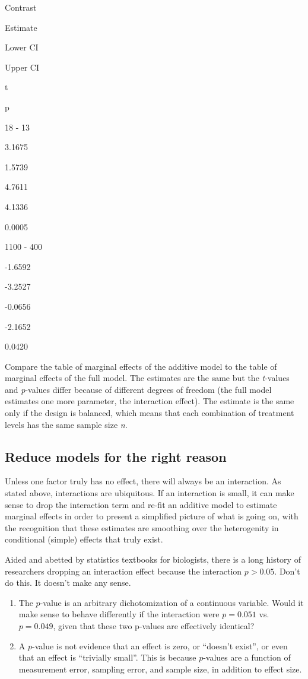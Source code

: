 \documentclass[]{book}
\providecommand{\tightlist}{%
  \setlength{\itemsep}{0pt}\setlength{\parskip}{0pt}}
\begin{document}
Contrast

Estimate

Lower CI

Upper CI

t

p

18 - 13

3.1675

1.5739

4.7611

4.1336

0.0005

1100 - 400

-1.6592

-3.2527

-0.0656

-2.1652

0.0420

Compare the table of marginal effects of the additive model to the table of marginal effects of the full model. The estimates are the same but the \emph{t}-values and \emph{p}-values differ because of different degrees of freedom (the full model estimates one more parameter, the interaction effect). The estimate is the same only if the design is balanced, which means that each combination of treatment levels has the same sample size \emph{n}.

\hypertarget{reduce-models-for-the-right-reason}{%
\subsection{Reduce models for the right reason}\label{reduce-models-for-the-right-reason}}

Unless one factor truly has no effect, there will always be an interaction. As stated above, interactions are ubiquitous. If an interaction is small, it can make sense to drop the interaction term and re-fit an additive model to estimate marginal effects in order to present a simplified picture of what is going on, with the recognition that these estimates are smoothing over the heterogenity in conditional (simple) effects that truly exist.

Aided and abetted by statistics textbooks for biologists, there is a long history of researchers dropping an interaction effect because the interaction \(p>0.05\). Don't do this. It doesn't make any sense.

\begin{enumerate}
\def\labelenumi{\arabic{enumi}.}
\tightlist
\item
  The \(p\)-value is an arbitrary dichotomization of a continuous variable. Would it make sense to behave differently if the interaction were \(p=0.051\) vs.~\(p=0.049\), given that these two p-values are effectively identical?
\item
  A \(p\)-value is not evidence that an effect is zero, or ``doesn't exist'', or even that an effect is ``trivially small''. This is because \(p\)-values are a function of measurement error, sampling error, and sample size, in addition to effect size.
\end{enumerate}
\end{document}
